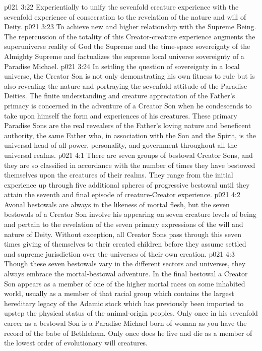 \vs p021 3:22 \bibnobreakspace Experientially to unify the sevenfold creature experience with the sevenfold experience of consecration to the revelation of the nature and will of Deity.
\vs p021 3:23 \bibnobreakspace To achieve new and higher relationship with the Supreme Being. The repercussion of the totality of this Creator\hyp{}creature experience augments the superuniverse reality of God the Supreme and the time\hyp{}space sovereignty of the Almighty Supreme and factualizes the supreme local universe sovereignty of a Paradise Michael.
\vs p021 3:24 \pc In settling the question of sovereignty in a local universe, the Creator Son is not only demonstrating his own fitness to rule but is also revealing the nature and portraying the sevenfold attitude of the Paradise Deities. The finite understanding and creature appreciation of the Father’s primacy is concerned in the adventure of a Creator Son when he condescends to take upon himself the form and experiences of his creatures. These primary Paradise Sons are the real revealers of the Father’s loving nature and beneficent authority, the same Father who, in association with the Son and the Spirit, is the universal head of all power, personality, and government throughout all the universal realms.
\vs p021 4:1 There are seven groups of bestowal Creator Sons, and they are so classified in accordance with the number of times they have bestowed themselves upon the creatures of their realms. They range from the initial experience up through five additional spheres of progressive bestowal until they attain the seventh and final episode of creature\hyp{}Creator experience.
\vs p021 4:2 Avonal bestowals are always in the likeness of mortal flesh, but the seven bestowals of a Creator Son involve his appearing on seven creature levels of being and pertain to the revelation of the seven primary expressions of the will and nature of Deity. Without exception, all Creator Sons pass through this seven times giving of themselves to their created children before they assume settled and supreme jurisdiction over the universes of their own creation.
\vs p021 4:3 Though these seven bestowals vary in the different sectors and universes, they always embrace the mortal\hyp{}bestowal adventure. In the final bestowal a Creator Son appears as a member of one of the higher mortal races on some inhabited world, usually as a member of that racial group which contains the largest hereditary legacy of the Adamic stock which has previously been imported to upstep the physical status of the animal\hyp{}origin peoples. Only once in his sevenfold career as a bestowal Son is a Paradise Michael born of woman as you have the record of the babe of Bethlehem. Only once does he live and die as a member of the lowest order of evolutionary will creatures.
